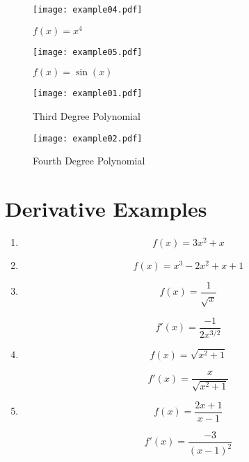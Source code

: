 \documentclass[letterpaper, landscape]{exam}
\begin{document}
  \begin{figure}[H]
    \centering
    \texttt{[image: example04.pdf]}
    \caption{$f(x) = x^4$}
    \label{fig:example04}
  \end{figure}

  \begin{figure}[H]
    \centering
    \texttt{[image: example05.pdf]}
    \caption{$f(x) = \sin(x)$}
    \label{fig:example05}
  \end{figure}

  \begin{figure}[H]
    \centering
    \texttt{[image: example01.pdf]}
    \caption{Third Degree Polynomial}
    \label{fig:example01}
  \end{figure}

  \begin{figure}[H]
    \centering
    \texttt{[image: example02.pdf]}
    \caption{Fourth Degree Polynomial}
    \label{fig:example02}
  \end{figure}

  \section{Derivative Examples}

  \begin{enumerate}
    \item 
      \[
        f(x) = 3x^2 + x
      \]
    \item 
      \[
        f(x) = x^3 - 2x^2 + x + 1
      \]

    \item 
      \[
        f(x) = \frac{1}{\sqrt{x}}
      \]

      \begin{solution}
        \[
          f'(x) = \frac{-1}{2 x^{3/2}}
        \]
      \end{solution}

    \item 
      \[
        f(x) = \sqrt{x^2 + 1}
      \]

      \begin{solution}
        \[
          f'(x) = \frac{x}{\sqrt{x^2 + 1}}
        \]
      \end{solution}

    \item 
      \[
        f(x) = \frac{2x + 1}{x - 1}
      \]

      \begin{solution}
        \[
          f'(x) = \frac{-3}{(x - 1)^2}
        \]
      \end{solution}

  \end{enumerate}
\end{document}
